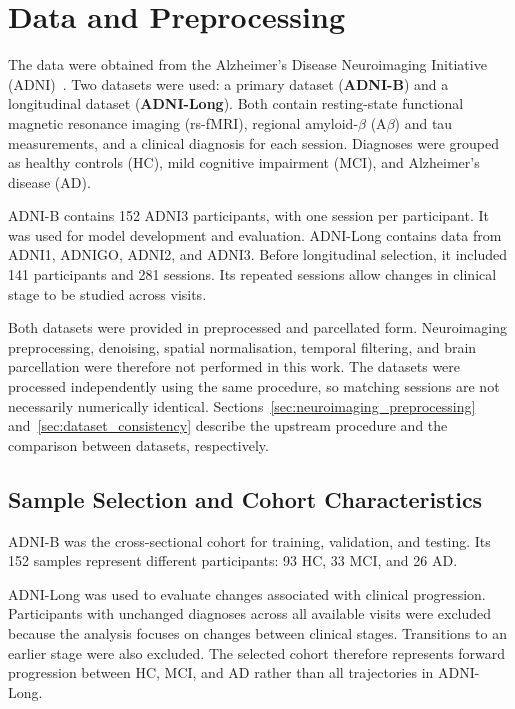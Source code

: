 \section{Data and Preprocessing}

The data were obtained from the Alzheimer's Disease Neuroimaging
Initiative (ADNI)~\cite{ADNI}. Two datasets were used: a primary dataset
(\textbf{ADNI-B}) and a longitudinal dataset (\textbf{ADNI-Long}).
Both contain resting-state functional magnetic resonance imaging
(rs-fMRI), regional amyloid-$\beta$ (A$\beta$) and tau measurements,
and a clinical diagnosis for each session. Diagnoses were grouped as
healthy controls (HC), mild cognitive impairment (MCI), and Alzheimer's
disease (AD).

ADNI-B contains 152 ADNI3 participants, with one session per
participant. It was used for model development and evaluation.
ADNI-Long contains data from ADNI1, ADNIGO, ADNI2, and ADNI3. Before
longitudinal selection, it included 141 participants and 281 sessions.
Its repeated sessions allow changes in clinical stage to be studied
across visits.

Both datasets were provided in preprocessed and parcellated form.
Neuroimaging preprocessing, denoising, spatial normalisation, temporal
filtering, and brain parcellation were therefore not performed in this
work. The datasets were processed independently using the same
procedure, so matching sessions are not necessarily numerically
identical. Sections~\ref{sec:neuroimaging_preprocessing}
and~\ref{sec:dataset_consistency} describe the upstream procedure and
the comparison between datasets, respectively.


\subsection{Sample Selection and Cohort Characteristics}
\label{sec:sample_selection}

ADNI-B was the cross-sectional cohort for training, validation, and
testing. Its 152 samples represent different participants: 93 HC, 33
MCI, and 26 AD.

ADNI-Long was used to evaluate changes associated with clinical
progression. Participants with unchanged diagnoses across all available
visits were excluded because the analysis focuses on changes between
clinical stages. Transitions to an earlier stage were also excluded.
The selected cohort therefore represents forward progression between
HC, MCI, and AD rather than all trajectories in ADNI-Long.


